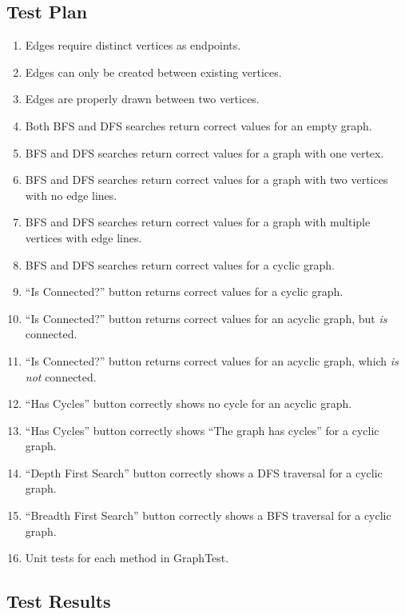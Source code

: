 \documentclass{scrartcl}
\begin{document}
\subsection{Test Plan}
\begin{enumerate}
  \item Edges require distinct vertices as endpoints.\label{test1}
  \item Edges can only be created between existing vertices.\label{test2}
  \item Edges are properly drawn between two vertices.\label{test3}
  \item Both BFS and DFS searches return correct values for an empty graph.\label{test4}
  \item BFS and DFS searches return correct values for a graph with one vertex.\label{test5}
  \item BFS and DFS searches return correct values for a graph with two vertices with no edge lines.\label{test6}
  \item BFS and DFS searches return correct values for a graph with multiple vertices with edge lines.\label{test7}
  \item BFS and DFS searches return correct values for a cyclic graph.\label{test8}
  \item \enquote{Is Connected?} button returns correct values for a cyclic graph.\label{test9}
  \item \enquote{Is Connected?} button returns correct values for an acyclic graph, but \emph{is} connected.\label{test10}
  \item \enquote{Is Connected?} button returns correct values for an acyclic graph, which \emph{is not} connected.\label{test11}
  \item \enquote{Has Cycles} button correctly shows no cycle for an acyclic graph.\label{test12}
  \item \enquote{Has Cycles} button correctly shows \enquote{The graph has cycles} for a cyclic graph.\label{test13}
  \item \enquote{Depth First Search} button correctly shows a DFS traversal for a cyclic graph.\label{test14}
  \item \enquote{Breadth First Search} button correctly shows a BFS traversal for a cyclic graph.\label{test15}
  \item Unit tests for each method in GraphTest.\label{unittests}
\end{enumerate}
\newpage
\subsection{Test Results}
\newpage
\newpage
\newpage
\newpage
\newpage
\newpage
\newpage
\newpage
\newpage
\newpage
\newpage
\newpage
\newpage
\newpage
\newpage
\newpage
\clearpage
\end{document}
